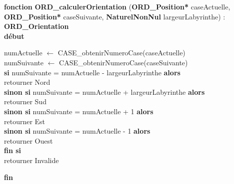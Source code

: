 \noindent\textbf{fonction} \textbf{ORD\_calculerOrientation} (\textbf{ORD\_Position*} caseActuelle, \textbf{ORD\_Position*} caseSuivante, \textbf{NaturelNonNul} largeurLabyrinthe) : \textbf{ORD\_Orientation}\\
\textbf{début}
\begin{flushleft}
    \hspace*{1cm}numActuelle $\gets$ CASE\_obtenirNumeroCase(caseActuelle)\\
    \hspace*{1cm}numSuivante $\gets$ CASE\_obtenirNumeroCase(caseSuivante)\\
    \hspace*{1cm}\textbf{si} numSuivante = numActuelle - largeurLabyrinthe \textbf{alors}\\
    \hspace*{2cm}retourner Nord\\
    \hspace*{1cm}\textbf{sinon si} numSuivante = numActuelle + largeurLabyrinthe \textbf{alors}\\
    \hspace*{2cm}retourner Sud\\
    \hspace*{1cm}\textbf{sinon si} numSuivante = numActuelle + 1 \textbf{alors}\\
    \hspace*{2cm}retourner Est\\
    \hspace*{1cm}\textbf{sinon si} numSuivante = numActuelle - 1 \textbf{alors}\\
    \hspace*{2cm}retourner Ouest\\
    \hspace*{1cm}\textbf{fin si}\\
    \hspace*{1cm}retourner Invalide
\end{flushleft}
\textbf{fin}\\


